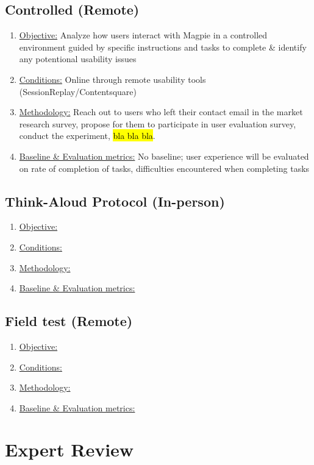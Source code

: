 \documentclass{report}
\begin{document}
\subsection{Controlled (Remote)}
\begin{enumerate}
    \item \underline{Objective:} Analyze how users interact with Magpie in a controlled environment guided by specific instructions and tasks to complete \& identify any potentional usability issues
    \item \underline{Conditions:} Online through remote usability tools (SessionReplay/Contentsquare)
    \item \underline{Methodology:} Reach out to users who left their contact email in the market research survey, propose for them to participate in user evaluation survey, conduct the experiment, \hl{bla bla bla}.
    \item \underline{Baseline \& Evaluation metrics:} No baseline; user experience will be evaluated on rate of completion of tasks, difficulties encountered when completing tasks
\end{enumerate}
\subsection{Think-Aloud Protocol (In-person)}
\begin{enumerate}
    \item \underline{Objective:}
    \item \underline{Conditions:}
    \item \underline{Methodology:}
    \item \underline{Baseline \& Evaluation metrics:}
\end{enumerate}
\subsection{Field test (Remote)}
\begin{enumerate}
    \item \underline{Objective:}
    \item \underline{Conditions:}
    \item \underline{Methodology:}
    \item \underline{Baseline \& Evaluation metrics:}
\end{enumerate}

\section{Expert Review}
\end{document}

